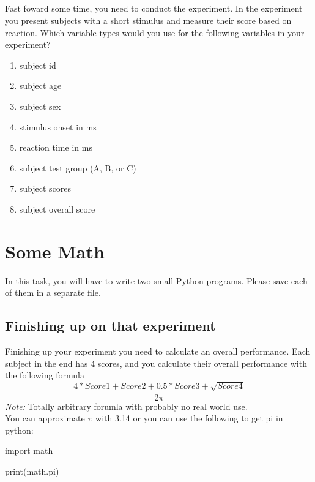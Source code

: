\subsection{}
Fast foward some time, you need to conduct the experiment. In the experiment you
present subjects with a short stimulus and measure their score based on reaction.
Which variable types would you use for the following variables in your experiment?
\begin{enumerate}
	\item subject id\\
	\item subject age\\
	\item subject sex\\
	\item stimulus onset in ms\\
	\item reaction time in ms\\
	\item subject test group (A, B, or C)\\
	\item subject scores\\
	\item subject overall score\\
\end{enumerate}

\section{Some Math}
In this task, you will have to write two small Python programs. Please save each
of them in a separate file.

\subsection{Finishing up on that experiment}
Finishing up your experiment you need to calculate an overall performance.
Each subject in the end has 4 scores, and you calculate their overall performance
with the following formula $$ \dfrac{4*Score1 + Score2 + 0.5*Score3 + \sqrt{Score4}}{2\pi} $$
\emph{Note:} Totally arbitrary forumla with probably no real world use.\\
You can approximate \(\pi \) with 3.14 or you can use the following to get pi in python:
\begin{python}
import math


print(math.pi)
\end{python}

